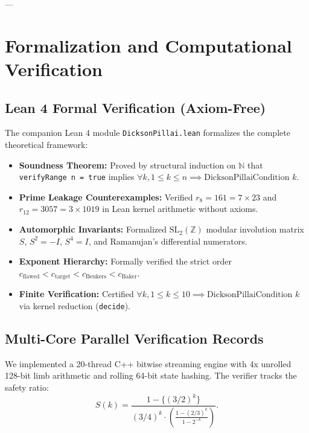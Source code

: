 \documentclass[11pt,reqno]{article}
\theoremstyle{plain}
\theoremstyle{definition}
\numberwithin{equation}{section}
\begin{document}
---

\section{Formalization and Computational Verification}

\subsection{Lean 4 Formal Verification (Axiom-Free)}
The companion Lean 4 module \texttt{DicksonPillai.lean} formalizes the complete theoretical framework:
\begin{itemize}
    \item \textbf{Soundness Theorem:} Proved by structural induction on $\mathbb{N}$ that \texttt{verifyRange n = true} implies $\forall k, 1 \le k \le n \implies \text{DicksonPillaiCondition } k$.
    \item \textbf{Prime Leakage Counterexamples:} Verified $r_8 = 161 = 7 \times 23$ and $r_{12} = 3057 = 3 \times 1019$ in Lean kernel arithmetic without axioms.
    \item \textbf{Automorphic Invariants:} Formalized $\mathrm{SL}_2(\mathbb{Z})$ modular involution matrix $S$, $S^2 = -I$, $S^4 = I$, and Ramanujan's differential numerators.
    \item \textbf{Exponent Hierarchy:} Formally verified the strict order $c_{\mathrm{flawed}} < c_{\mathrm{target}} < c_{\mathrm{Beukers}} < c_{\mathrm{Baker}}$.
    \item \textbf{Finite Verification:} Certified $\forall k, 1 \le k \le 10 \implies \text{DicksonPillaiCondition } k$ via kernel reduction (\texttt{decide}).
\end{itemize}

\subsection{Multi-Core Parallel Verification Records}
We implemented a 20-thread C++ bitwise streaming engine with 4x unrolled 128-bit limb arithmetic and rolling 64-bit state hashing. The verifier tracks the safety ratio:
\begin{equation}
S(k) = \frac{1 - \{(3/2)^k\}}{(3/4)^k \cdot \left(\frac{1 - (2/3)^k}{1 - 2^{-k}}\right)}.
\end{equation}
\end{document}
